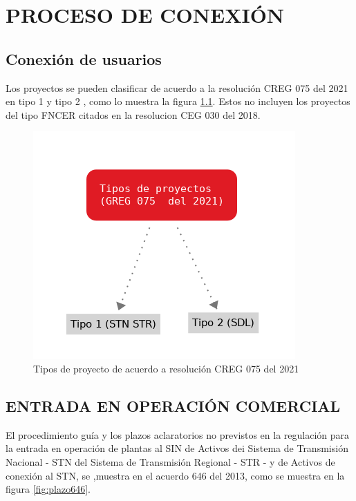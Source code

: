\documentclass[a5paper]{book}%
\begin{document}
  
  
\chapter{PROCESO DE CONEXIÓN}



\section{Conexión de usuarios}

Los proyectos se pueden clasificar de acuerdo a la resolución CREG 075
del 2021 en tipo 1 y tipo 2 , como lo muestra la figura
\ref{fig:tipoproyecto}. Estos no incluyen los proyectos del tipo
\ac{FNCER} citados en la resolucion CEG 030 del 2018.


\begin{figure}[H]
  \centering \includegraphics[width=1\linewidth]{tipoproyecto}
  \caption{Tipos de proyecto de acuerdo a resolución CREG 075 del
    2021}
  \label{fig:tipoproyecto}
\end{figure}

    \section{ENTRADA EN OPERACIÓN COMERCIAL}

    El procedimiento guía y los plazos aclaratorios no previstos en la regulación para la entrada en operación de plantas al SIN de Activos dei Sistema de Transmisión Nacional - STN del Sistema de Transmisión Regional - STR - y de Activos de conexión al STN,  se ,muestra en el acuerdo 646 del 2013, como se muestra en la figura \ref{fig:plazo646}.
\end{document}
